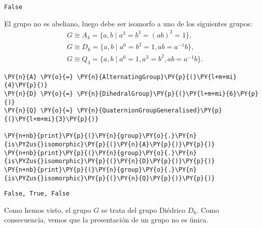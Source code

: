\begin{enumerate}
            \begin{tcolorbox}[breakable, size=fbox, boxrule=.5pt, pad at break*=1mm, opacityfill=0]
\begin{Verbatim}[commandchars=\\\{\}]
False
\end{Verbatim}
\end{tcolorbox}
        
    El grupo no es abeliano, luego debe ser isomorfo a uno de los siguientes grupos:
\begin{align*}
    &G \cong A_4 = \{ a,b \; | \; a^3=b^3=(ab)^2=1 \} , \\
    &G \cong D_6 = \{ a,b \; | \; a^6=b^2=1, ab=a^{-1}b \}, \\ 
    &G \cong Q_3 = \{ a,b \; | \; a^{6}=1, a^3=b^2, ab=a^{-1}b \}.
\end{align*}

    \begin{tcolorbox}[breakable, size=fbox, boxrule=1pt, pad at break*=1mm,colback=cellbackground, colframe=cellborder]
\begin{Verbatim}[commandchars=\\\{\}]
\PY{n}{A} \PY{o}{=} \PY{n}{AlternatingGroup}\PY{p}{(}\PY{l+m+mi}{4}\PY{p}{)}
\PY{n}{D} \PY{o}{=} \PY{n}{DihedralGroup}\PY{p}{(}\PY{l+m+mi}{6}\PY{p}{)}
\PY{n}{Q} \PY{o}{=} \PY{n}{QuaternionGroupGeneralised}\PY{p}{(}\PY{l+m+mi}{3}\PY{p}{)}

\PY{n+nb}{print}\PY{p}{(}\PY{n}{group}\PY{o}{.}\PY{n}{is\PYZus{}isomorphic}\PY{p}{(}\PY{n}{A}\PY{p}{)}\PY{p}{)}
\PY{n+nb}{print}\PY{p}{(}\PY{n}{group}\PY{o}{.}\PY{n}{is\PYZus{}isomorphic}\PY{p}{(}\PY{n}{D}\PY{p}{)}\PY{p}{)}
\PY{n+nb}{print}\PY{p}{(}\PY{n}{group}\PY{o}{.}\PY{n}{is\PYZus{}isomorphic}\PY{p}{(}\PY{n}{Q}\PY{p}{)}\PY{p}{)}
\end{Verbatim}
\end{tcolorbox}

 \begin{tcolorbox}[breakable, size=fbox, boxrule=.5pt, pad at break*=1mm, opacityfill=0]
    \begin{Verbatim}[commandchars=\\\{\}]
False, True, False
    \end{Verbatim}
\end{tcolorbox}
Como hemos visto, el grupo $G$ se trata del grupo Diédrico $D_6$. Como consecuencia, vemos que la presentación de un grupo no es única.
\end{enumerate}



